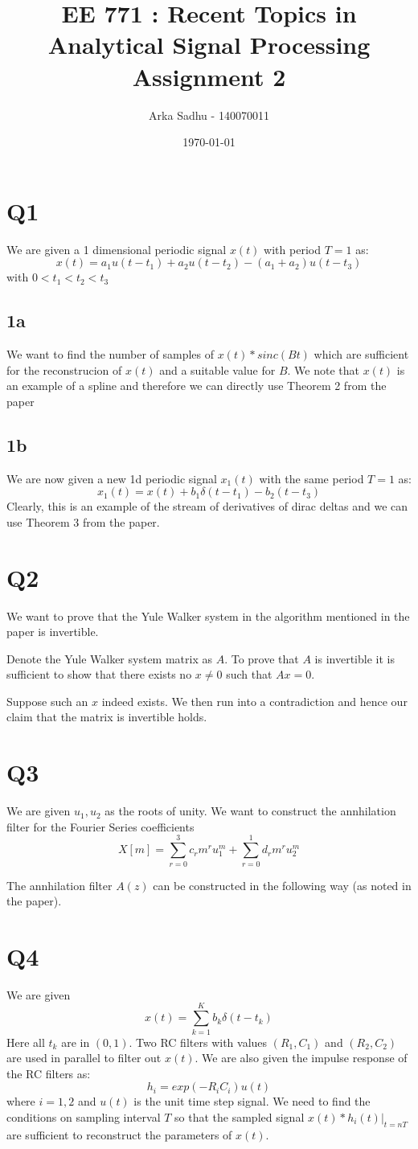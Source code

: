 \documentclass{article}
\title{EE 771 : Recent Topics in Analytical Signal Processing Assignment 2}
\author{Arka Sadhu - 140070011}
\date{\today}
\begin{document}
\maketitle

\section*{Q1}
We are given a 1 dimensional periodic signal $x(t)$ with period $T=1$ as:
$$x(t) = a_1 u(t - t_1) + a_2 u(t - t_2) - (a_1 + a_2) u(t - t_3)$$
with $0 < t_1 < t_2 < t_3$
\subsection*{1a}
We want to find the number of samples of $x(t) * sinc(Bt)$ which are sufficient for the reconstrucion of $x(t)$ and a suitable value for $B$. We note that $x(t)$ is an example of a spline and therefore we can directly use Theorem 2 from the paper

\subsection*{1b}
We are now given a new 1d periodic signal $x_1(t)$ with the same period $T=1$ as:
$$x_1(t) = x(t) + b_1 \delta (t - t_1) - b_2 (t - t_3)$$
Clearly, this is an example of the stream of derivatives of dirac deltas and we can use Theorem 3 from the paper.

\section*{Q2}
We want to prove that the Yule Walker system in the algorithm mentioned in the paper is invertible.

Denote the Yule Walker system matrix as $A$. To prove that $A$ is invertible it is sufficient to show that there exists no $x \ne 0$ such that $Ax = 0$.

Suppose such an $x$ indeed exists. We then run into a contradiction and hence our claim that the matrix is invertible holds.

\section*{Q3}
We are given $u_1, u_2$ as the roots of unity. We want to construct the annhilation filter for the Fourier Series coefficients $$X[m] = \sum_{r=0}^3 c_r m^r u_1^m + \sum_{r=0}^1 d_r m^r u_2^m$$

The annhilation filter $A(z)$ can be constructed in the following way (as noted in the paper).

\section*{Q4}
We are given
$$x(t) = \sum_{k=1}^K b_k \delta (t - t_k)$$
Here all $t_k$ are in $(0, 1)$. Two RC filters with values $(R_1,C_1)$ and $(R_2, C_2)$ are used in parallel to filter out $x(t)$. We are also given the impulse response of the RC filters as:
$$h_i = exp(-R_i C_i) u(t)$$
where $i = 1, 2$ and $u(t)$ is the unit time step signal. We need to find the conditions on sampling interval $T$ so that the sampled signal $x(t) * h_i(t)|_{t = nT}$ are sufficient to reconstruct the parameters of $x(t)$.
\end{document}

